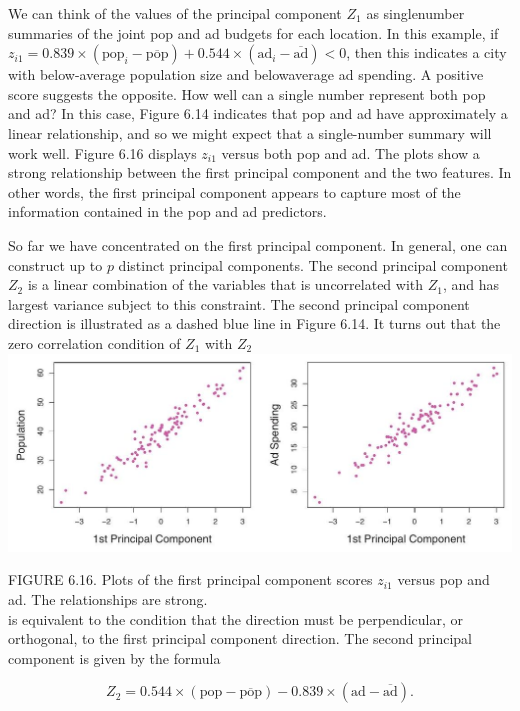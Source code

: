 \documentclass[10pt]{article}
\begin{document}
We can think of the values of the principal component $Z_{1}$ as singlenumber summaries of the joint pop and ad budgets for each location. In this example, if $z_{i 1}=0.839 \times\left(\mathrm{pop}_{i}-\overline{\mathrm{pop}}\right)+0.544 \times\left(\mathrm{ad}_{i}-\overline{\mathrm{ad}}\right)<0$, then this indicates a city with below-average population size and belowaverage ad spending. A positive score suggests the opposite. How well can a single number represent both pop and ad? In this case, Figure 6.14 indicates that pop and ad have approximately a linear relationship, and so we might expect that a single-number summary will work well. Figure 6.16 displays $z_{i 1}$ versus both pop and ad. The plots show a strong relationship between the first principal component and the two features. In other words, the first principal component appears to capture most of the information contained in the pop and ad predictors.

So far we have concentrated on the first principal component. In general, one can construct up to $p$ distinct principal components. The second principal component $Z_{2}$ is a linear combination of the variables that is uncorrelated with $Z_{1}$, and has largest variance subject to this constraint. The second principal component direction is illustrated as a dashed blue line in Figure 6.14. It turns out that the zero correlation condition of $Z_{1}$ with $Z_{2}$\\
\includegraphics[max width=\textwidth, center]{2025_05_05_efe77898333945044de4g-248}

FIGURE 6.16. Plots of the first principal component scores $z_{i 1}$ versus pop and ad. The relationships are strong.\\
is equivalent to the condition that the direction must be perpendicular, or orthogonal, to the first principal component direction. The second principal component is given by the formula

$$
Z_{2}=0.544 \times(\mathrm{pop}-\overline{\mathrm{pop}})-0.839 \times(\mathrm{ad}-\overline{\mathrm{ad}}) .
$$
\end{document}
